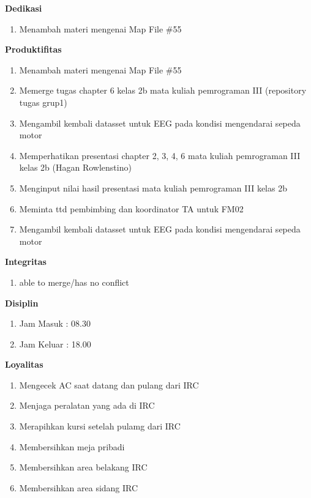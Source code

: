 \begin{enumerate}
\textbf{Dedikasi}
\begin{enumerate}
\item Menambah materi mengenai Map File \#55
\end{enumerate}

\textbf{Produktifitas}
\begin{enumerate}
\item Menambah materi mengenai Map File \#55
\item Memerge tugas chapter 6 kelas 2b mata kuliah pemrograman III (repository tugas grup1)
\item Mengambil kembali datasset untuk EEG pada kondisi mengendarai sepeda motor
\item Memperhatikan presentasi chapter 2, 3, 4, 6 mata kuliah pemrograman III kelas 2b (Hagan Rowlenstino)
\item Menginput nilai hasil presentasi mata kuliah pemrograman III kelas 2b
\item Meminta ttd pembimbing dan koordinator TA untuk FM02 
\item Mengambil kembali datasset untuk EEG pada kondisi mengendarai sepeda motor
\end{enumerate}

\textbf{Integritas}
\begin{enumerate}
\item able to merge/has no conflict
\end{enumerate}

\textbf{Disiplin}
\begin{enumerate}
\item Jam Masuk : 08.30
\item Jam Keluar : 18.00
\end{enumerate}

\textbf{Loyalitas}
\begin{enumerate}
\item Mengecek AC saat datang dan pulang dari IRC
\item Menjaga peralatan yang ada di IRC
\item Merapihkan kursi setelah pulamg dari IRC
\item Membersihkan meja pribadi
\item Membersihkan area belakang IRC
\item Membersihkan area sidang IRC
\end{enumerate}


\end{enumerate}
